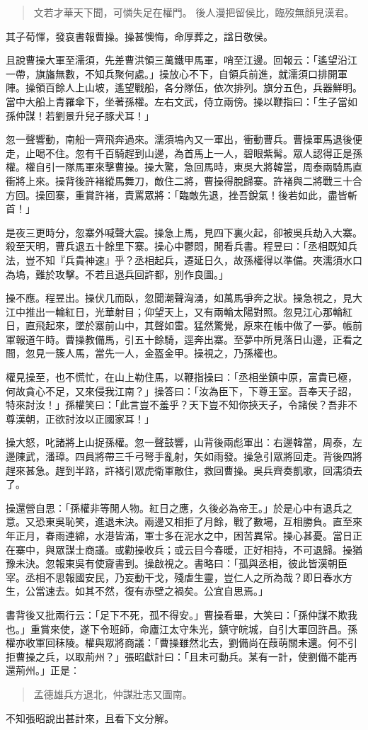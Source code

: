 \begin{quote}
文若才華天下聞，可憐失足在權門。
後人漫把留侯比，臨歿無顏見漢君。
\end{quote}

其子荀惲，發哀書報曹操。操甚懊悔，命厚葬之，諡日敬侯。

且說曹操大軍至濡須，先差曹洪領三萬鐵甲馬軍，哨至江邊。回報云：「遙望沿江一帶，旗旛無數，不知兵聚何處。」操放心不下，自領兵前進，就濡須口排開軍陣。操領百餘人上山坡，遙望戰船，各分隊伍，依次排列。旗分五色，兵器鮮明。當中大船上青羅傘下，坐著孫權。左右文武，侍立兩傍。操以鞭指曰：「生子當如孫仲謀！若劉景升兒子豚犬耳！」

忽一聲響動，南船一齊飛奔過來。濡須塢內又一軍出，衝動曹兵。曹操軍馬退後便走，止喝不住。忽有千百騎趕到山邊，為首馬上一人，碧眼紫髯。眾人認得正是孫權。權自引一隊馬軍來擊曹操。操大驚，急回馬時，東吳大將韓當，周泰兩騎馬直衝將上來。操背後許褚縱馬舞刀，敵住二將，曹操得脫歸寨。許褚與二將戰三十合方回。操回寨，重賞許褚，責罵眾將：「臨敵先退，挫吾銳氣！後若如此，盡皆斬首！」

是夜三更時分，忽寨外喊聲大震。操急上馬，見四下裏火起，卻被吳兵劫入大寨。殺至天明，曹兵退五十餘里下寨。操心中鬱悶，閒看兵書。程昱曰：「丞相既知兵法，豈不知『兵貴神速』乎？丞相起兵，遷延日久，故孫權得以準備。夾濡須水口為塢，難於攻擊。不若且退兵回許都，別作良圖。」

操不應。程昱出。操伏几而臥，忽聞潮聲洶湧，如萬馬爭奔之狀。操急視之，見大江中推出一輪紅日，光華射目；仰望天上，又有兩輪太陽對照。忽見江心那輪紅日，直飛起來，墜於寨前山中，其聲如雷。猛然驚覺，原來在帳中做了一夢。帳前軍報道午時。曹操教備馬，引五十餘騎，逕奔出寨。至夢中所見落日山邊，正看之間，忽見一簇人馬，當先一人，金盔金甲。操視之，乃孫權也。

權見操至，也不慌忙，在山上勒住馬，以鞭指操曰：「丞相坐鎮中原，富貴已極，何故貪心不足，又來侵我江南？」操答曰：「汝為臣下，下尊王室。吾奉天子詔，特來討汝！」孫權笑曰：「此言豈不羞乎？天下豈不知你挾天子，令諸侯？吾非不尊漢朝，正欲討汝以正國家耳！」

操大怒，叱諸將上山捉孫權。忽一聲鼓響，山背後兩彪軍出：右邊韓當，周泰，左邊陳武，潘璋。四員將帶三千弓弩手亂射，矢如雨發。操急引眾將回走。背後四將趕來甚急。趕到半路，許褚引眾虎衛軍敵住，救回曹操。吳兵齊奏凱歌，回濡須去了。

操還營自思：「孫權非等閒人物。紅日之應，久後必為帝王。」於是心中有退兵之意。又恐東吳恥笑，進退未決。兩邊又相拒了月餘，戰了數場，互相勝負。直至來年正月，春雨連綿，水港皆滿，軍士多在泥水之中，困苦異常。操心甚憂。當日正在寨中，與眾謀士商議。或勸操收兵；或云目今春暖，正好相持，不可退歸。操猶豫未決。忽報東吳有使齎書到。操啟視之。書略曰：「孤與丞相，彼此皆漢朝臣宰。丞相不思報國安民，乃妄動干戈，殘虐生靈，豈仁人之所為哉？即日春水方生，公當速去。如其不然，復有赤壁之禍矣。公宜自思焉。」

書背後又批兩行云：「足下不死，孤不得安。」曹操看畢，大笑曰：「孫仲謀不欺我也。」重賞來使，遂下令班師，命廬江太守朱光，鎮守皖城，自引大軍回許昌。孫權亦收軍回秣陵。權與眾將商議：「曹操雖然北去，劉備尚在葭萌關未還。何不引拒曹操之兵，以取荊州？」張昭獻計曰：「且未可動兵。某有一計，使劉備不能再還荊州。」正是：

\begin{quote}
孟德雄兵方退北，仲謀壯志又圖南。
\end{quote}

不知張昭說出甚計來，且看下文分解。

